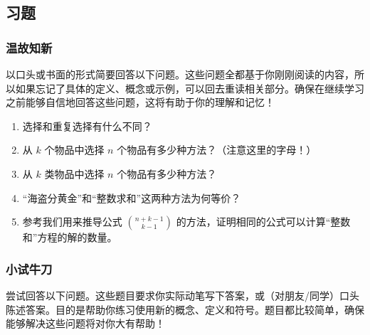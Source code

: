 
\subsection{习题}

\subsubsection*{温故知新}

以口头或书面的形式简要回答以下问题。这些问题全都基于你刚刚阅读的内容，所以如果忘记了具体的定义、概念或示例，可以回去重读相关部分。确保在继续学习之前能够自信地回答这些问题，这将有助于你的理解和记忆！

\begin{enumerate}[label=(\arabic*)]
    \item 选择和重复选择有什么不同？
    \item 从 $k$ 个物品中选择 $n$ 个物品有多少种方法？（注意这里的字母！）
    \item 从 $k$ 类物品中选择 $n$ 个物品有多少种方法？
    \item ``海盗分黄金''和``整数求和''这两种方法为何等价？
    \item 参考我们用来推导公式 ${n+k-1 \choose k-1}$ 的方法，证明相同的公式可以计算``整数和''方程的解的数量。
\end{enumerate}

\subsubsection*{小试牛刀}

尝试回答以下问题。这些题目要求你实际动笔写下答案，或（对朋友/同学）口头陈述答案。目的是帮助你练习使用新的概念、定义和符号。题目都比较简单，确保能够解决这些问题将对你大有帮助！


